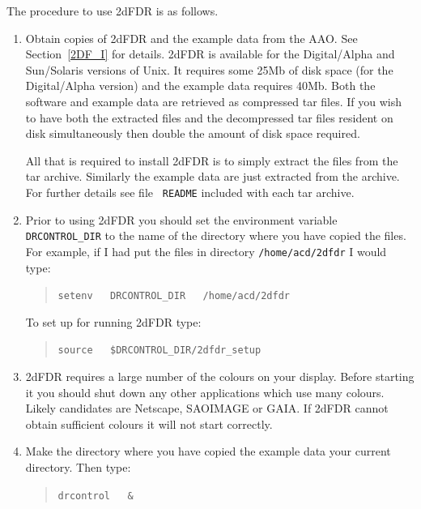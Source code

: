 \documentclass[twoside,11pt]{article}
\begin{document}
The procedure to use 2dFDR is as follows.

\begin{enumerate}

  \item Obtain copies of 2dFDR and the example data from the AAO.
   See Section~\ref{2DF_I} for details.  2dFDR is available for the
   Digital/Alpha and Sun/Solaris versions of Unix.  It requires some 25Mb
   of disk space (for the Digital/Alpha version) and the example data
   requires 40Mb.  Both the software and example data are retrieved as
   compressed tar files.  If you wish to have both the extracted files
   and the decompressed tar files resident on disk simultaneously then
   double the amount of disk space required.

   All that is required to install 2dFDR is to simply extract the
   files from the tar archive.  Similarly the example data are just
   extracted from the archive.  For further details see file {\tt
   README} included with each tar archive.

  \item Prior to using 2dFDR you should set the environment variable
   {\tt DRCONTROL\_DIR} to the name of the directory where you have
   copied the files.  For example, if I had put the files in directory
   {\tt /home/acd/2dfdr} I would type:

  \begin{quote}
   {\tt setenv ~ DRCONTROL\_DIR ~ /home/acd/2dfdr}
  \end{quote}

   To set up for running 2dFDR type:

  \begin{quote}
   {\tt source ~ \$DRCONTROL\_DIR/2dfdr\_setup}
  \end{quote}

  \item 2dFDR requires a large number of the colours on your display.
   Before starting it you should shut down any other applications which
   use many colours.  Likely candidates are Netscape, SAOIMAGE or
   GAIA.  If 2dFDR cannot obtain sufficient colours it will not start
   correctly.

  \item Make the directory where you have copied the example data
   your current directory.  Then type:

  \begin{quote}
   {\tt drcontrol ~ \&}
  \end{quote}


\end{enumerate}
\end{document}
